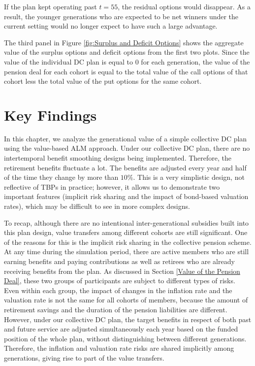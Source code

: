 \documentclass{sfuthesis}
\numberwithin{equation}{chapter}
\begin{document}
	
		\justify
		If the plan kept operating past $t=55$, the residual options would disappear. As a result, the younger generations who are expected to be net winners under the current setting would no longer expect to have such a large advantage.
	
	
		\justify
		The third panel in Figure \ref{fig:Surplus and Deficit Options} shows the aggregate value of the surplus options and deficit options from the first two plots. Since the value of the individual DC plan is equal to $0$ for each generation, the value of the pension deal for each cohort is equal to the total value of the call options of that cohort less the total value of the put options for the same cohort.
	
	
	\section{Key Findings}
	\label{Key Findings}
	\justify
	In this chapter, we analyze the generational value of a simple collective DC plan using the value-based ALM approach. Under our collective DC plan, there are no intertemporal benefit smoothing designs being implemented. Therefore, the retirement benefits fluctuate a lot. The benefits are adjusted every year and half of the time they change by more than $10\%$. This is a very simplistic design, not reflective of TBPs in practice; however, it allows us to demonstrate two important features (implicit risk sharing and the impact of bond-based valuation rates), which may be difficult to see in more complex designs.
	
	\justify
	To recap, although there are no intentional inter-generational subsidies built into this plan design, value transfers among different cohorts are still significant. One of the reasons for this is the implicit risk sharing in the collective pension scheme. At any time during the simulation period, there are active members who are still earning benefits and paying contributions as well as retirees who are already receiving benefits from the plan. As discussed in Section \ref{Value of the Pension Deal}, these two groups of participants are subject to different types of risks. Even within each group, the impact of changes in the inflation rate and the valuation rate is not the same for all cohorts of members, because the amount of retirement savings and the duration of the pension liabilities are different. However, under our collective DC plan, the target benefits in respect of both past and future service are adjusted simultaneously each year based on the funded position of the whole plan, without distinguishing between different generations. Therefore, the inflation and valuation rate risks are shared implicitly among generations, giving rise to part of the value transfers.
	
\end{document}
